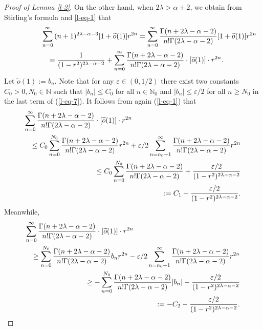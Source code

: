 \documentclass[10pt,a4paper]{amsart}
\begin{document}
\begin{proof}[Proof of Lemma \ref{l-2}]
On the other hand, when $2\lambda>\alpha+2$, we obtain from Stirling's formula and \ref{l-eq-1} that 
  \begin{eqnarray}\label{l-eq-7}
 \lefteqn{\sum_{n=0}^{\infty}{(n+1)^{2\lambda-\alpha-3}}[1+\widetilde{o}(1)]r^{2n}=\sum_{n=0}^{\infty}\frac{\Gamma(n+2\lambda-\alpha-2)}{n!\Gamma(2\lambda-\alpha-2)}[1+\widetilde{o}(1)]r^{2n}}\nonumber \\
 &&=\frac{1}{{(1-r^2)^{2\lambda-\alpha-2}}}+\sum_{n=0}^{\infty}\frac{\Gamma(n+2\lambda-\alpha-2)}{n!\Gamma(2\lambda-\alpha-2)}\cdot [\widetilde{o}(1)]\cdot r^{2n}. 
 \end{eqnarray}
Let $\widetilde{o}(1):=b_n$. Note that for any $\varepsilon\in (0,1/2)$ there exist two constants $C_0>0, N_0\in \mathbb{N}$ such that $|b_n|\leq C_0$ for all $n\in \mathbb{N}_0$ and $|b_n|\leq \varepsilon/2$ for all $n\geq N_0$ in the last term of (\ref{l-eq-7}). 
It follows from again  (\ref{l-eq-1}) that
\begin{eqnarray}\label{l-eq-8}
\lefteqn{\sum_{n=0}^{\infty}\frac{\Gamma(n+2\lambda-\alpha-2)}{n!\Gamma(2\lambda-\alpha-2)}\cdot [\widetilde{o}(1)]\cdot r^{2n}} \nonumber \\
  && \leq C_0\sum_{n=0}^{N_0} \frac{\Gamma(n+2\lambda-\alpha-2)}{n!\Gamma(2\lambda-\alpha-2)}r^{2n}+\varepsilon/2\sum_{n={{n_0}+1}}^{\infty}\frac{\Gamma(n+2\lambda-\alpha-2)}{n!\Gamma(2\lambda-\alpha-2)}r^{2n} \nonumber \\
  && \leq C_0\sum_{n=0}^{N_0} \frac{\Gamma(n+2\lambda-\alpha-2)}{n!\Gamma(2\lambda-\alpha-2)}+\frac{\varepsilon/2}{{(1-r^2)^{2\lambda-\alpha-2}}}\nonumber \\
  &&:=C_1+\frac{\varepsilon/2}{{(1-r^2)^{2\lambda-\alpha-2}}}.
  \end{eqnarray}
Meanwhile, \begin{eqnarray}\label{l-eq-9}
\lefteqn{\sum_{n=0}^{\infty}\frac{\Gamma(n+2\lambda-\alpha-2)}{n!\Gamma(2\lambda-\alpha-2)}\cdot [\widetilde{o}(1)]\cdot r^{2n}} \nonumber \\
  && \geq \sum_{n=0}^{N_0} \frac{\Gamma(n+2\lambda-\alpha-2)}{n!\Gamma(2\lambda-\alpha-2)}b_n r^{2n}-\varepsilon/2\sum_{n={{n_0}+1}}^{\infty}\frac{\Gamma(n+2\lambda-\alpha-2)}{n!\Gamma(2\lambda-\alpha-2)}r^{2n} \nonumber \\
  && \geq -\sum_{n=0}^{N_0} \frac{\Gamma(n+2\lambda-\alpha-2)}{n!\Gamma(2\lambda-\alpha-2)}|b_n|-\frac{\varepsilon/2}{{(1-r^2)^{2\lambda-\alpha-2}}}\nonumber \\
  &&:=-C_2-\frac{\varepsilon/2}{{(1-r^2)^{2\lambda-\alpha-2}}}.
  \end{eqnarray}

\end{proof}
\end{document}
